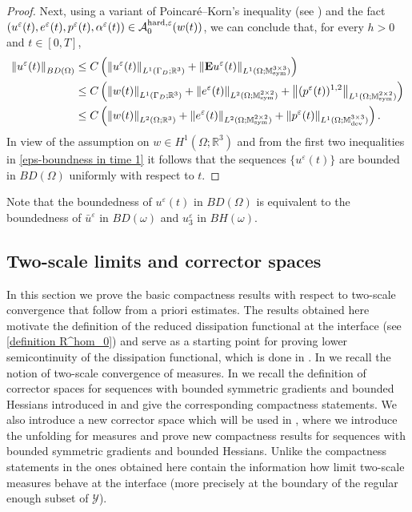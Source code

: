 \documentclass[reqno,10pt]{amsart}
\numberwithin{equation}{section}
\theoremstyle{remark}
\newcommand{\calA}{\mathcal{A}}
\newcommand{\M}{\mathbb{M}}
\newcommand{\R}{\mathbb{R}}
\newcommand{\calY}{\mathcal{Y}}
\DeclareMathOperator{\dev}{dev}
\DeclareMathOperator{\sym}{sym}
\newcommand{\Dir}{D}
\newcommand{\eps}{\varepsilon}
\newcommand{\E}{{\bf E}}
\begin{document}
\begin{proof}
Next, using a variant of Poincar\'{e}--Korn's inequality (see \cite[Chapter II, Proposition 2.4]{Temam.1985}) and the fact $(u^\eps(t), e^\eps(t), p^\eps(t), \alpha^\eps(t)) \in \calA_{0}^{\rm hard,\eps}(w(t))$, we can conclude that, for every $h > 0$ and $t \in [0,T]$,
\begin{align*}
	\left\|u^\eps(t)\right\|_{BD(\Omega)} & \leq C \left(\left\|u^\eps(t)\right\|_{L^1(\Gamma_\Dir;\R^3)} + \left\|{\E}u^\eps(t)\right\|_{L^1(\Omega;\M^{3 \times 3}_{\sym})}\right)\\
	& \leq C \left(\left\|w(t)\right\|_{L^1(\Gamma_\Dir;\R^3)} + \left\|e^\eps(t)\right\|_{L^2(\Omega;\M^{2 \times 2}_{\sym})} + \left\|(p^\eps(t))^{1,2}\right\|_{L^1(\Omega;\M^{2 \times 2}_{\sym})}\right)\\
	& \leq C \left(\left\|w(t)\right\|_{L^2(\Omega;\R^3)} + \left\|e^\eps(t)\right\|_{L^2(\Omega;\M^{2 \times 2}_{\sym})} + \left\|p^\eps(t)\right\|_{L^1(\Omega;\M^{3 \times 3}_{\dev})}\right).
\end{align*}
In view of the assumption on $w \in H^1(\Omega;\R^3)$ and from the first two inequalities in \eqref{eps-boundness in time 1} it follows that the sequences $\{u^\eps(t)\}$ are bounded in $BD(\Omega)$ uniformly with respect to $t$.
\end{proof}

Note that the boundedness of $u^{\eps}(t)$ in $BD(\Omega)$ is equivalent to the boundedness of $\bar{u}^{\eps}$ in $BD(\omega)$ and $u_3^{\eps}$ in $BH(\omega)$. 

\subsection{Two-scale limits and corrector spaces} \label{section two-scale limits} 

In this section we prove the basic compactness results with respect to two-scale convergence that follow from a priori estimates. 
The results obtained here motivate the definition of the reduced dissipation functional at the interface (see \eqref{definition R^hom_0}) and serve as a starting point for proving lower semicontinuity of the dissipation functional, which is done in . 
In  we recall the notion of two-scale convergence of measures. 
In  we recall the definition of corrector spaces for sequences with bounded symmetric gradients and bounded Hessians introduced in \cite[Section 4.1.2]{Buzancic.Davoli.Velcic.2024.2nd} and give the corresponding compactness statements.
We also introduce a new corrector space which will be used in , where we introduce the unfolding for measures and prove new compactness results for sequences with bounded symmetric gradients and bounded Hessians. 
Unlike the compactness statements in  the ones obtained here contain the information how limit two-scale measures behave at the interface (more precisely at the boundary of the regular enough subset of $\calY$).
\end{document}
